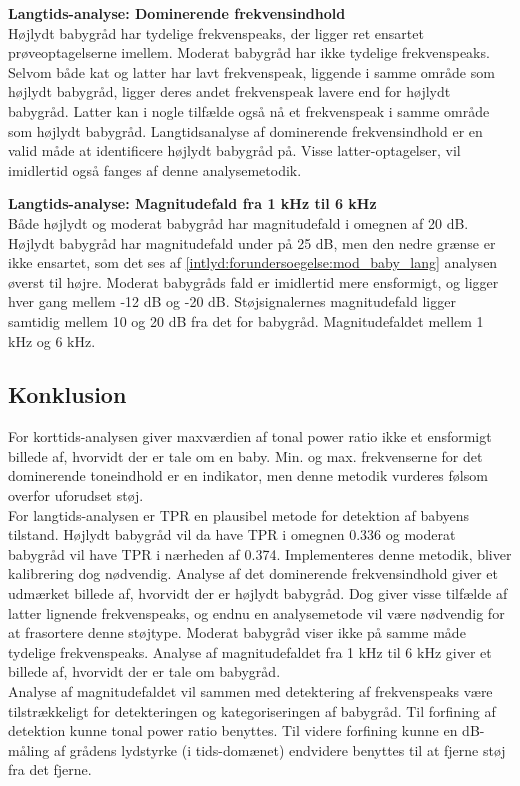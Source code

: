 \textbf{Langtids-analyse: Dominerende frekvensindhold}	\\
Højlydt babygråd har tydelige frekvenspeaks, der ligger ret ensartet prøveoptagelserne imellem. Moderat babygråd har ikke tydelige frekvenspeaks. Selvom både kat og latter har lavt frekvenspeak, liggende i samme område som højlydt babygråd, ligger deres andet frekvenspeak lavere end for højlydt babygråd. Latter kan i nogle tilfælde også nå et frekvenspeak i samme område som højlydt babygråd. Langtidsanalyse af dominerende frekvensindhold er en valid måde at identificere højlydt babygråd på. Visse latter-optagelser, vil imidlertid også fanges af denne analysemetodik.

\textbf{Langtids-analyse: Magnitudefald fra 1 kHz til 6 kHz}	\\
Både højlydt og moderat babygråd har magnitudefald i omegnen af 20 dB. Højlydt babygråd har magnitudefald under på 25 dB, men den nedre grænse er ikke ensartet, som det ses af \ref{intlyd:forundersoegelse:mod_baby_lang} analysen øverst til højre. Moderat babygråds fald er imidlertid mere ensformigt, og ligger hver gang mellem -12 dB og -20 dB. Støjsignalernes magnitudefald ligger samtidig mellem 10 og 20 dB fra det for babygråd. Magnitudefaldet mellem 1 kHz og 6 kHz.

\newpage
\subsection*{Konklusion}
For korttids-analysen giver maxværdien af tonal power ratio ikke et ensformigt billede af, hvorvidt der er tale om en baby. Min. og max. frekvenserne for det dominerende toneindhold er en indikator, men denne metodik vurderes følsom overfor uforudset støj. \\
For langtids-analysen er TPR en plausibel metode for detektion af babyens tilstand. Højlydt babygråd vil da have TPR i omegnen 0.336 og moderat babygråd vil have TPR i nærheden af 0.374. Implementeres denne metodik, bliver kalibrering dog nødvendig. Analyse af det dominerende frekvensindhold giver et udmærket billede af, hvorvidt der er højlydt babygråd. Dog giver visse tilfælde af latter lignende frekvenspeaks, og endnu en analysemetode vil være nødvendig for at frasortere denne støjtype. Moderat babygråd viser ikke på samme måde tydelige frekvenspeaks. Analyse af magnitudefaldet fra 1 kHz til 6 kHz giver et billede af, hvorvidt der er tale om babygråd. \\
Analyse af magnitudefaldet vil sammen med detektering af frekvenspeaks være tilstrækkeligt for detekteringen og kategoriseringen af babygråd. Til forfining af detektion kunne tonal power ratio benyttes. Til videre forfining kunne en dB-måling af grådens lydstyrke (i tids-domænet) endvidere benyttes til at fjerne støj fra det fjerne. 